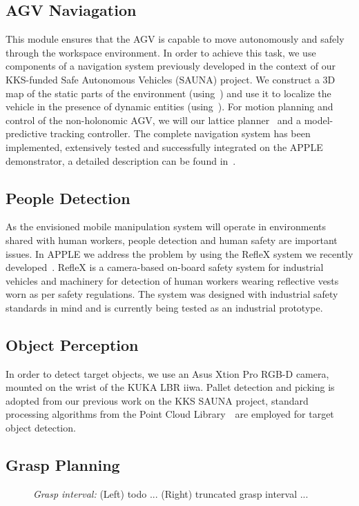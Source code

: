\subsection{AGV Naviagation}
\label{subsec:navigation}
%
This module ensures that the AGV is capable to move autonomously and safely through the workspace
environment. In order to achieve this task, we use components of a navigation system previously
developed in the context of our KKS-funded Safe Autonomous Vehicles (SAUNA) project. We construct a
3D map of the static parts of the environment (using~\cite{Stoy13}) and use it to localize the
vehicle in the presence of dynamic entities (using~\cite{Vale14}). For motion planning and control
of the non-holonomic AGV, we will our lattice planner~\cite{Ciri14} and a model-predictive tracking
controller. The complete navigation system has been implemented, extensively tested and successfully
integrated on the APPLE demonstrator, a detailed description can be found in~\cite{Andr15}.


%
\subsection{People Detection}
\label{subsec:people_det}
%
As the envisioned mobile manipulation system will operate in environments shared with human workers,
people detection and human safety are important issues. In APPLE we address the problem by using the
RefleX system we recently developed~\cite{Mosb14}. RefleX is a camera-based on-board safety system
for industrial vehicles and machinery for detection of human workers wearing reflective vests worn
as per safety regulations. The system was designed with industrial safety standards in mind and is
currently being tested as an industrial prototype.
%
\subsection{Object Perception}
\label{subsec:perception}
%
In order to detect target objects, we use an Asus Xtion Pro RGB-D camera, mounted on the wrist of
the KUKA LBR iiwa. Pallet detection and picking is adopted from our previous work on the KKS SAUNA
project, standard processing algorithms from the Point Cloud Library~\cite{Rusu11}~are employed for
target object detection.
%
\subsection{Grasp Planning}
\label{subsec:grasp_planning}
\begin{figure}[t!] 
   \centering
     
   \caption{\textit{Grasp interval:} (Left) todo ... (Right) truncated grasp interval ...} 
   \label{fig:grasp_interval}
\end{figure}

